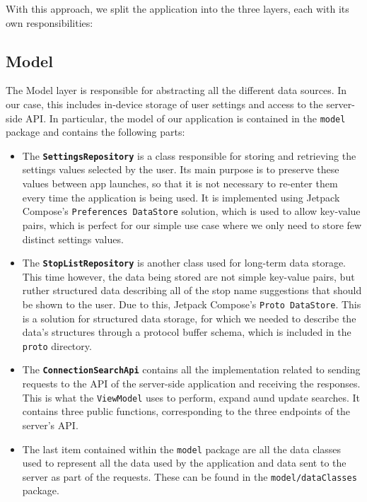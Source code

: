 With this approach, we split the application into the three layers, each with its own responsibilities:

\subsection{Model}

The Model layer is responsible for abstracting all the different data sources. In our case, this includes in-device storage of user settings and access to the server-side API. In particular, the model of our application is contained in the \texttt{model} package and contains the following parts:

\begin{itemize}
    \item The \textbf{\texttt{SettingsRepository}} is a class responsible for storing and retrieving the settings values selected by the user. Its main purpose is to preserve these values between app launches, so that it is not necessary to re-enter them every time the application is being used. It is implemented using Jetpack Compose's \texttt{Preferences DataStore} solution, which is used to allow key-value pairs, which is perfect for our simple use case where we only need to store few distinct settings values.
    \item The \textbf{\texttt{StopListRepository}} is another class used for long-term data storage. This time however, the data being stored are not simple key-value pairs, but ruther structured data describing all of the stop name suggestions that should be shown to the user. Due to this, Jetpack Compose's \texttt{Proto DataStore}. This is a solution for structured data storage, for which we needed to describe the data's structures through a protocol buffer schema, which is included in the \texttt{proto} directory. 
    \item The \textbf{\texttt{ConnectionSearchApi}} contains all the implementation related to sending requests to the API of the server-side application and receiving the responses. This is what the \texttt{ViewModel} uses to perform, expand aund update searches. It contains three public functions, corresponding to the three endpoints of the server's API.
    \item The last item contained within the \texttt{model} package are all the data classes used to represent all the data used by the application and data sent to the server as part of the requests. These can be found in the \texttt{model/dataClasses} package.
\end{itemize}

